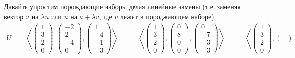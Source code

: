 \documentclass[12pt,a4paper]{article}
\begin{document}
    \begin{enumproblem}[.1]
        Давайте упростим порождающие наборы делая линейные замены (т.е. заменяя вектор $u$ на $\lambda u$ или $u$ на $u + \lambda v$, где $v$ лежит в породжающем наборе):
        \begin{align*}
            U
            &= \left\langle
                \begin{pmatrix}
                    1 \\ 3 \\ 2 \\ 0
                \end{pmatrix},
                \begin{pmatrix}
                    -2 \\ 2 \\ -4 \\ 0
                \end{pmatrix},
                \begin{pmatrix}
                    1 \\ -4 \\ -1 \\ -3
                \end{pmatrix}
            \right\rangle&
            &= \left\langle
                \begin{pmatrix}
                    1 \\ 3 \\ 2 \\ 0
                \end{pmatrix},
                \begin{pmatrix}
                    0 \\ 8 \\ 0 \\ 0
                \end{pmatrix},
                \begin{pmatrix}
                    0 \\ -7 \\ -3 \\ -3
                \end{pmatrix}
            \right\rangle&
            &= \left\langle
                \begin{pmatrix}
                    1 \\ 3 \\ 2 \\ 0
                \end{pmatrix},
                \begin{pmatrix}

\end{pmatrix}
\end{align*}
\end{enumproblem}
\end{document}
